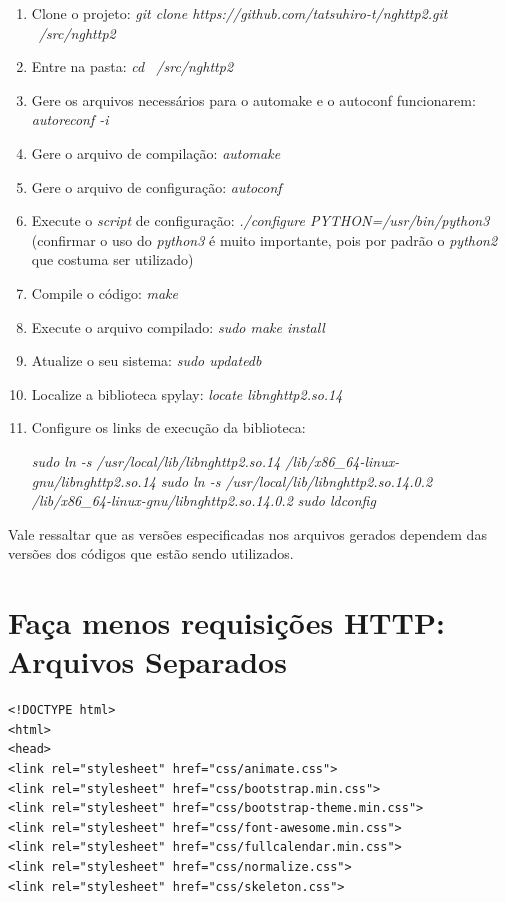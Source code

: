 \begin{apendicesenv}
\begin{enumerate}
	\item Clone o projeto: \textit{git clone https://github.com/tatsuhiro-t/nghttp2.git ~/src/nghttp2}
	\item Entre na pasta: \textit{cd ~/src/nghttp2}
	\item Gere os arquivos necessários para o automake e o autoconf funcionarem: \textit{autoreconf -i}
	\item Gere o arquivo de compilação: \textit{automake}
	\item Gere o arquivo de configuração: \textit{autoconf}
	\item Execute o \textit{script} de configuração: \textit{./configure PYTHON=/usr/bin/python3} (confirmar o uso do \textit{python3} é muito importante, pois por padrão o \textit{python2} que costuma ser utilizado)
	\item Compile o código: \textit{make}
	\item Execute o arquivo compilado: \textit{sudo make install}
	\item Atualize o seu sistema: \textit{sudo updatedb}
	\item Localize a biblioteca spylay: \textit{locate libnghttp2.so.14}
	\item Configure os links de execução da biblioteca:
		\begin{center}
			\textit{sudo ln -s /usr/local/lib/libnghttp2.so.14 /lib/x86\_64-linux-gnu/libnghttp2.so.14}
			\textit{sudo ln -s /usr/local/lib/libnghttp2.so.14.0.2 /lib/x86\_64-linux-gnu/libnghttp2.so.14.0.2}
			\textit{sudo ldconfig}
		\end{center}
\end{enumerate}

Vale ressaltar que as versões especificadas nos arquivos gerados dependem das versões dos códigos que estão sendo utilizados.

\lstset{
	frame=single,
    breaklines=true,
    language=HTML
    }
\chapter{Faça menos requisições HTTP: Arquivos Separados}
\label{apend:codigo_facamenosrequisicoeshttp_sep}

\begin{lstlisting}
<!DOCTYPE html>
<html>
<head>
<link rel="stylesheet" href="css/animate.css">
<link rel="stylesheet" href="css/bootstrap.min.css">
<link rel="stylesheet" href="css/bootstrap-theme.min.css">
<link rel="stylesheet" href="css/font-awesome.min.css">
<link rel="stylesheet" href="css/fullcalendar.min.css">
<link rel="stylesheet" href="css/normalize.css">
<link rel="stylesheet" href="css/skeleton.css">
	

\end{lstlisting}
\end{apendicesenv}
